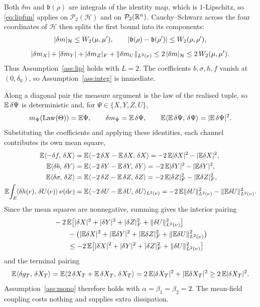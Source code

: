 \begin{example}
Both $\delta m$ and $\mathfrak b(\rho)$ are integrals of the identity map, which is
$1$-Lipschitz, so \eqref{eq:lipfun} applies on $\mathcal P_2(\mathcal H)$ and on
$\mathcal P_2(\mathbb{R}^n)$. Cauchy--Schwarz across the four coordinates of $\mathcal H$ then splits
the first bound into its components:
\[
\begin{gathered}
|\delta m|_{\mathcal H}\le W_2(\mu,\mu') ,\qquad
|\mathfrak b(\rho)-\mathfrak b(\rho')|\le W_2(\rho,\rho') ,\\[1.4ex]
|\delta m_X|+|\delta m_Y|+|\delta m_Z|_F+\lVert \delta m_U\rVert_{L^2(\nu)}
\le 2\,|\delta m|_{\mathcal H}\le 2\,W_2(\mu,\mu') .
\end{gathered}
\]
Thus Assumption~\ref{ass:lip} holds with $L=2$. The coefficients $b,\sigma,h,f$ vanish at $(0,\delta_0)$, so Assumption~\ref{ass:integ} is
immediate.

Along a diagonal pair the measure argument is the law of the realised tuple, so
$\mathbb{E}\,\delta\Psi$ is deterministic and, for $\Psi\in\{X,Y,Z,U\}$,
\[
m_\Psi(\mathrm{Law}(\Theta))=\mathbb{E}\Psi,\qquad
\delta m_\Psi=\mathbb{E}\,\delta\Psi,\qquad
\mathbb{E}\langle \mathbb{E}\,\delta\Psi,\,\delta\Psi\rangle=|\mathbb{E}\,\delta\Psi|^2 .
\]
Substituting the coefficients and applying these identities, each channel contributes its own
mean square,
\[
\begin{aligned}
\mathbb{E}\langle -\delta f,\,\delta X\rangle
&=\mathbb{E}\langle -2\,\delta X-\mathbb{E}\,\delta X,\,\delta X\rangle=-2\,\mathbb{E}|\delta X|^2-|\mathbb{E}\delta X|^2,\\
\mathbb{E}\langle \delta b,\,\delta Y\rangle
&=\mathbb{E}\langle -2\,\delta Y-\mathbb{E}\,\delta Y,\,\delta Y\rangle=-2\,\mathbb{E}|\delta Y|^2-|\mathbb{E}\delta Y|^2,\\
\mathbb{E}\langle \delta\sigma,\,\delta Z\rangle
&=\mathbb{E}\langle -2\,\delta Z-\mathbb{E}\,\delta Z,\,\delta Z\rangle=-2\,\mathbb{E}|\delta Z|_F^2-|\mathbb{E}\delta Z|_F^2,\\
\mathbb{E}\!\int_E\!\langle \delta h(e),\,\delta U(e)\rangle\,\nu(\mathrm{d} e)
&=\mathbb{E}\langle -2\,\delta U-\mathbb{E}\,\delta U,\,\delta U\rangle_{L^2(\nu)}
=-2\,\mathbb{E}\lVert \delta U\rVert_{L^2(\nu)}^2-\lVert \mathbb{E}\delta U\rVert_{L^2(\nu)}^2 .
\end{aligned}
\]
Since the mean squares are nonnegative, summing gives the interior pairing
\[
\begin{aligned}
&-2\,\mathbb{E}\big[|\delta X|^2+|\delta Y|^2+|\delta Z|_F^2+\lVert \delta U\rVert_{L^2(\nu)}^2\big]\\
&\qquad-\big(|\mathbb{E}\delta X|^2+|\mathbb{E}\delta Y|^2+|\mathbb{E}\delta Z|_F^2+\lVert \mathbb{E}\delta U\rVert_{L^2(\nu)}^2\big)\\
&\qquad\le-2\,\mathbb{E}\big[|\delta X|^2+|\delta Y|^2+|\delta Z|_F^2+\lVert \delta U\rVert_{L^2(\nu)}^2\big]
\end{aligned}
\]
and the terminal pairing
\[
\mathbb{E}\langle \delta g_T,\,\delta X_T\rangle
=\mathbb{E}\langle 2\,\delta X_T+\mathbb{E}\,\delta X_T,\,\delta X_T\rangle
=2\,\mathbb{E}|\delta X_T|^2+|\mathbb{E}\delta X_T|^2
\ge2\,\mathbb{E}|\delta X_T|^2 .
\]
Assumption~\ref{ass:mono} therefore holds with $\alpha=\beta_1=\beta_2=2$. The mean-field
coupling costs nothing and supplies extra dissipation.


\end{example}
